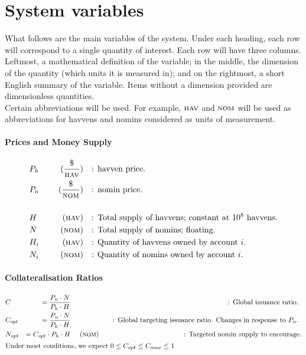 
\section{System variables}


\noindent What follows are the main variables of the system. Under each
heading, each row will correspond to a single quantity of interest. Each row
will have three columns. Leftmost, a mathematical definition of the variable;
in the middle, the dimension of the quantity (which units it is measured in);
and on the rightmost, a short English summary of the variable. Items without
a dimension provided are dimensionless quantities. \\

\noindent Certain abbreviations will be used. For example, \(\textsc{hav}{}\) and
\(\textsc{nom}{}\) will be used as abbreviations for havvens and nomins considered as
units of measurement. \\

\paragraph{Prices and Money Supply}
\begin{align*}
    &P_h \ && &(\frac{\text{\$}}{\textsc{hav}{}}) && &\text{: havven price.} \\
    &P_n \ && &(\frac{\text{\$}}{\textsc{nom}{}}) && &\text{: nomin price.} \\
    \intertext{}
    &H \ && &(\textsc{hav}{}) && &\text{: Total supply of havvens; constant at \(10^8\) havvens.} \\
    &N \ && &(\textsc{nom}{}) && &\text{: Total supply of nomins; floating.} \\
    &H_i \ && &(\textsc{hav}{}) && &\text{: Quantity of havvens owned by account \(i\).} \\
    &N_i \ && &(\textsc{nom}{}) && &\text{: Quantity of nomins owned by account \(i\).} \\
\end{align*}

\paragraph{Collateralisation Ratios}
\begin{align*}
    &C &= \frac{P_n \cdot N}{P_h \cdot H} \ && & && &\text{: Global issuance ratio. } \\
    &C_{opt} &= \frac{P_n \cdot N}{P_h \cdot H} \ && & && &\text{: Global targeting issuance ratio. Changes in response to \(P_n\). } \\
    &N_{opt} &= C_{opt} \cdot P_h \cdot H \ && &(\textsc{nom}{}) && &\text{: Targeted nomin supply to encourage.} \\
    \intertext{Under most conditions, we expect \(0 \leq C_{opt} \leq C_{max} \leq 1\)}
\end{align*}
\\

